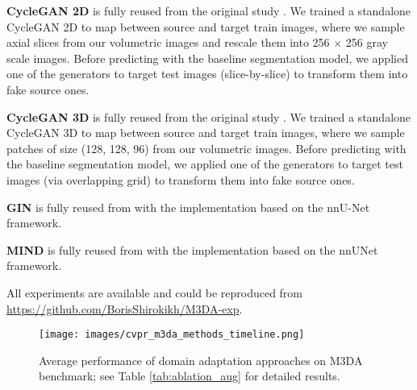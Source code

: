 \textbf{CycleGAN 2D} is fully reused from the original study \cite{cyclegan}. We trained a standalone CycleGAN 2D to map between source and target train images, where we sample axial slices from our volumetric images and rescale them into 256 $\times$ 256 gray scale images. Before predicting with the baseline segmentation model, we applied one of the generators to target test images (slice-by-slice) to transform them into fake source ones.


\textbf{CycleGAN 3D} is fully reused from the original study \cite{cyclegan3d}. We trained a standalone CycleGAN 3D to map between source and target train images, where we sample patches of size (128, 128, 96) from our volumetric images. Before predicting with the baseline segmentation model, we applied one of the generators to target test images (via overlapping grid) to transform them into fake source ones.


\textbf{GIN} is fully reused from \cite{gin} with the implementation based on the nnU-Net framework.


\textbf{MIND} is fully reused from \cite{dg_tta} with the implementation based on the nnUNet framework.


All experiments are available and could be reproduced from \href{https://github.com/BorisShirokikh/M3DA-exp}{https://github.com/BorisShirokikh/M3DA-exp}.

\begin{figure}
    \texttt{[image: images/cvpr\_m3da\_methods\_timeline.png]}
    \caption{Average performance of domain adaptation approaches on M3DA benchmark; see Table \ref{tab:ablation_aug} for detailed results.}  %
    \label{fig:teaser3}
\end{figure}
